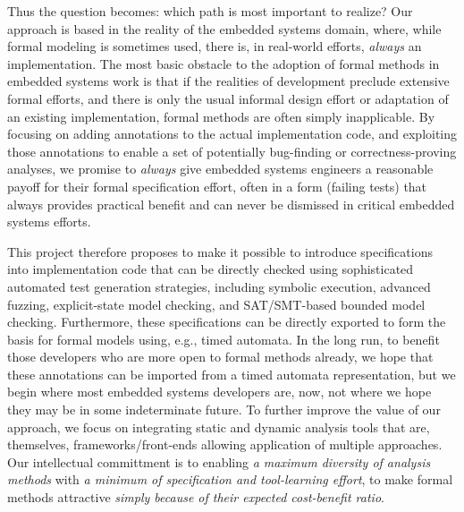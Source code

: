 Thus the question becomes:  which path is most important to realize?  Our approach is based in the reality of the embedded systems domain, where, while formal modeling is sometimes used, there is, in real-world efforts, \emph{always} an implementation.  The most basic obstacle to the adoption of formal methods in embedded systems work is that if the realities of development preclude extensive formal efforts, and there is only the usual informal design effort or adaptation of an existing implementation, formal methods are often simply inapplicable.  By focusing on adding annotations to the actual implementation code, and exploiting those annotations to enable a set of potentially bug-finding or correctness-proving analyses, we promise to \emph{always} give embedded systems engineers a reasonable payoff for their formal specification effort, often in a form (failing tests) that always provides practical benefit and can never be dismissed in critical embedded systems efforts.

This project therefore proposes to make it possible to introduce specifications into implementation code that can be directly checked using sophisticated automated test generation strategies, including symbolic execution, advanced fuzzing, explicit-state model checking, and SAT/SMT-based bounded model checking.   Furthermore, these specifications can be directly exported to form the basis for formal models using, e.g., timed automata.  In the long run, to benefit those developers who are more open to formal methods already, we hope that these annotations can be imported from a timed automata representation, but we begin where most embedded systems developers are, now, not where we hope they may be in some indeterminate future.
To further improve the value of our approach, we focus on integrating static and dynamic analysis tools that are, themselves, frameworks/front-ends allowing application of multiple approaches.  Our intellectual committment is to enabling \emph{a maximum diversity of analysis methods} with \emph{a minimum of specification and tool-learning effort}, to make formal methods attractive \emph{simply because of their expected cost-benefit ratio}.

